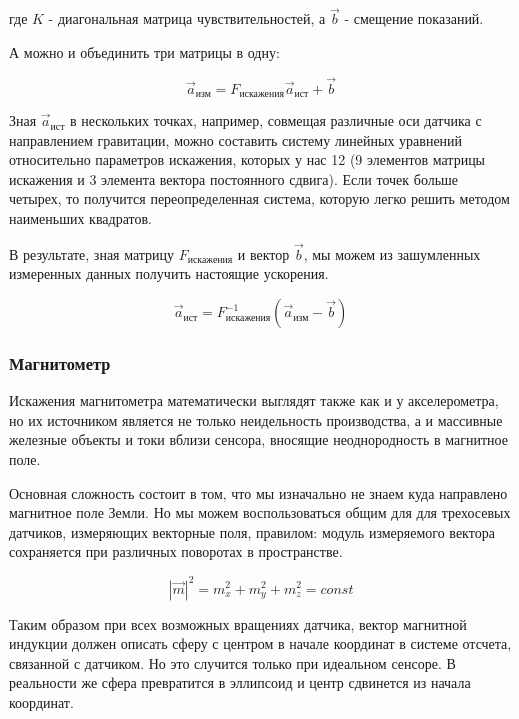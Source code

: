 \documentclass[12pt,a4paper]{article}
\begin{document}
где $K$ - диагональная матрица чувствительностей, а $\vec{b}$ - смещение показаний.

А можно и объединить три матрицы в одну:

$$ \vec{a}_{\text{изм}} = F_{\text{искажения}}\vec{a}_{\text{ист}} + \vec{b} $$

Зная $\vec{a}_{\text{ист}}$ в нескольких точках, например, совмещая различные оси датчика с направлением гравитации, можно составить систему линейных уравнений относительно параметров искажения, которых у нас 12 (9 элементов матрицы искажения и 3 элемента вектора постоянного сдвига). Если точек больше четырех, то получится переопределенная система, которую легко решить методом наименьших квадратов.

В результате, зная матрицу $F_{\text{искажения}}$ и вектор $\vec{b}$, мы можем из зашумленных измеренных данных получить настоящие ускорения.

$$ \vec{a}_{\text{ист}} = F_{\text{искажения}}^{-1}(\vec{a}_{\text{изм}} - \vec{b})  $$

\subsubsection{Магнитометр}

Искажения магнитометра математически выглядят также как и у акселерометра, но их источником является не только неидельность производства, а и массивные железные объекты и токи вблизи сенсора, вносящие неоднородность в магнитное поле.

Основная сложность состоит в том, что мы изначально не знаем куда направлено магнитное поле Земли. Но мы можем воспользоваться общим для для трехосевых датчиков, измеряющих векторные поля, правилом: модуль измеряемого вектора сохраняется при различных поворотах в пространстве.

$$ |\vec{m}|^2 = m_x^2 + m_y^2 + m_z^2 = const $$

Таким образом при всех возможных вращениях датчика, вектор магнитной индукции должен описать сферу с центром в начале координат в системе отсчета, связанной с датчиком. Но это случится только при идеальном сенсоре. В реальности же сфера превратится в эллипсоид и центр сдвинется из начала координат.
\end{document}
